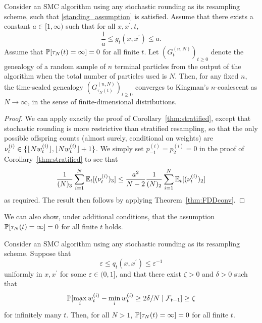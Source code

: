 \begin{corollary}\label{thm:stochrounding}
Consider an SMC algorithm using any stochastic rounding as its resampling scheme, such that \ref{standing_assumption} is satisfied.
Assume that there exists a constant $a\in [1,\infty)$ such that for all $x, x^\prime, t$,
\begin{equation*}
\frac{1}{a} \leq g_t(x, x^\prime) \leq a . 
\end{equation*}
Assume that $\mathbb{P}[ \tau_N(t) = \infty] =0$ for all finite $t$.
Let $(G_t^{(n,N)})_{t\geq0}$ denote the genealogy of a random sample of $n$ terminal particles from the output of the algorithm when the total number of particles used is $N$. Then, for any fixed $n$, the time-scaled genealogy $(G_{\tau_N(t)}^{(n,N)})_{t\geq0}$ converges to Kingman's $n$-coalescent as $N\to \infty$, in the sense of finite-dimensional distributions.
\end{corollary}

\begin{proof}
We can apply exactly the proof of Corollary~\ref{thm:stratified}, except that stochastic rounding is more restrictive than stratified resampling, so that the only possible offspring counts (almost surely, conditional on weights) are $\nu_t^{(i)} \in \{ \lfloor N w_t^{(i)} \rfloor, \lfloor N w_t^{(i)} \rfloor +1 \}$. We simply set $p_{-1}^{(i)} = p_{2}^{(i)} = 0$ in the proof of Corollary~\ref{thm:stratified} to see that
\begin{equation*}
\frac{1}{(N)_3} \sum_{i=1}^{N} \mathbb{E}_t [(\nu_t^{(i)})_3 ]
\leq \frac{a^2}{N-2} \frac{1}{(N)_2} \sum_{i=1}^{N} \mathbb{E}_t [(\nu_t^{(i)})_2 ]
\end{equation*}
as required.
The result then follows by applying Theorem~\ref{thm:FDDconv}.
\end{proof}


We can also show, under additional conditions, that the assumption $\mathbb{P}[ \tau_N(t) = \infty ] =0$ for all finite $t$ holds.

\begin{prop}\label{thm:SR_nontriviality}
Consider an SMC algorithm using any stochastic rounding as its resampling scheme.
Suppose that 
\begin{equation*}
\varepsilon \leq q_t(x, x^\prime) \leq \varepsilon^{-1}
\end{equation*}
uniformly in $x,x^\prime$ for some $\varepsilon \in (0,1]$, and that there exist $\zeta >0$ and $\delta >0$ such that 
\begin{equation*}
\mathbb{P}[ \max_i w_t^{(i)} - \min_i w_t^{(i)} \geq 2\delta/N \mid \mathcal{F}_{t-1} ] \geq \zeta
\end{equation*}
 for infinitely many $t$. Then, for all $N>1$, $\mathbb{P}[ \tau_N(t) = \infty ] =0$ for all finite $t$.
\end{prop}

